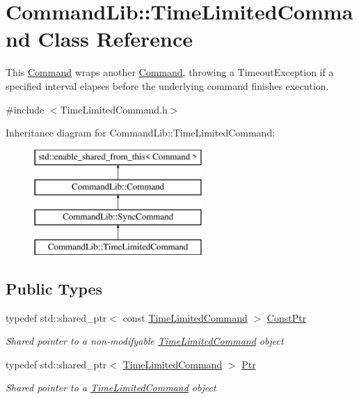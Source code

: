 \hypertarget{class_command_lib_1_1_time_limited_command}{}\section{Command\+Lib\+:\+:Time\+Limited\+Command Class Reference}
\label{class_command_lib_1_1_time_limited_command}


This \mbox{\hyperlink{class_command_lib_1_1_command}{Command}} wraps another \mbox{\hyperlink{class_command_lib_1_1_command}{Command}}, throwing a Timeout\+Exception if a specified interval elapses before the underlying command finishes execution.  




{\ttfamily \#include $<$Time\+Limited\+Command.\+h$>$}

Inheritance diagram for Command\+Lib\+:\+:Time\+Limited\+Command\+:\begin{figure}[H]
\begin{center}
\leavevmode
\includegraphics[height=4.000000cm]{class_command_lib_1_1_time_limited_command}
\end{center}
\end{figure}
\subsection*{Public Types}
\begin{DoxyCompactItemize}
\item 
typedef std\+::shared\+\_\+ptr$<$ const \mbox{\hyperlink{class_command_lib_1_1_time_limited_command}{Time\+Limited\+Command}} $>$ \mbox{\hyperlink{class_command_lib_1_1_time_limited_command_ae2953ea50b6e131e481a2cd309b3a943}{Const\+Ptr}}
\begin{DoxyCompactList}\small\item\em Shared pointer to a non-\/modifyable \mbox{\hyperlink{class_command_lib_1_1_time_limited_command}{Time\+Limited\+Command}} object\end{DoxyCompactList}\item 
typedef std\+::shared\+\_\+ptr$<$ \mbox{\hyperlink{class_command_lib_1_1_time_limited_command}{Time\+Limited\+Command}} $>$ \mbox{\hyperlink{class_command_lib_1_1_time_limited_command_aecfced587f9da8eb1493b7bbc8759b8b}{Ptr}}
\begin{DoxyCompactList}\small\item\em Shared pointer to a \mbox{\hyperlink{class_command_lib_1_1_time_limited_command}{Time\+Limited\+Command}} object\end{DoxyCompactList}\end{DoxyCompactItemize}
